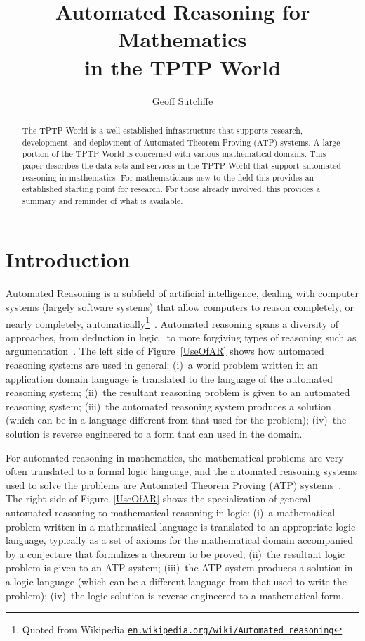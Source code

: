 \documentclass[runningheads]{llncs}
\title{Automated Reasoning for Mathematics \\ in the TPTP World}
\author{
  Geoff Sutcliffe\orcidID{0000-0001-9120-3927}\Envelope
}
\institute{
  University of Miami,
  Miami, USA\\
  \email{geoff@cs.miami.edu}\\
}
\begin{document}
\maketitle

\begin{abstract}
The TPTP World is a well established infrastructure that supports research, development, and 
deployment of Automated Theorem Proving (ATP) systems.
A large portion of the TPTP World is concerned with various mathematical domains.
This paper describes the data sets and services in the TPTP World that support automated reasoning 
in mathematics.
For mathematicians new to the field this provides an established starting point for research.
For those already involved, this provides a summary and reminder of what is available.
\end{abstract}
\section{Introduction}
\label{Introduction}

Automated Reasoning is a subfield of artificial intelligence, dealing with computer systems
(largely software systems) that allow computers to reason completely, or nearly completely, 
automatically\footnote{%
Quoted from Wikipedia \href{https://en.wikipedia.org/wiki/Automated_reasoning}{{\tt en.wikipedia.org/wiki/Automated\_reasoning}}}~\cite{RV01-HAR}.
Automated reasoning spans a diversity of approaches, from deduction in logic~\cite{Gal15} to more 
forgiving types of reasoning such as argumentation~\cite{vE+14}.
The left side of Figure~\ref{UseOfAR} shows how automated reasoning systems are used in general: 
(i)~a world problem written in an application domain language is translated to the language
of the automated reasoning system; (ii)~the resultant reasoning problem is given to an automated 
reasoning system; (iii)~the automated reasoning system produces a solution (which can be in a
language different from that used for the problem); (iv)~the solution is reverse engineered to a
form that can used in the domain.

For automated reasoning in mathematics, the mathematical problems are very often translated to 
a formal logic language, and the automated reasoning systems used to solve the problems are 
Automated Theorem Proving (ATP) systems~\cite{Bun83,RV01-HAR}.
The right side of Figure~\ref{UseOfAR} shows the specialization of general automated reasoning
to mathematical reasoning in logic:
(i)~a mathematical problem written in a mathematical language is translated to an appropriate 
logic language, typically as a set of axioms for the mathematical domain accompanied by a 
conjecture that formalizes a theorem to be proved; (ii)~the resultant logic problem is given 
to an ATP system; (iii)~the ATP system produces a solution in a logic language (which can be 
a different language from that used to write the problem); (iv)~the logic solution is reverse 
engineered to a mathematical form.
\end{document}
